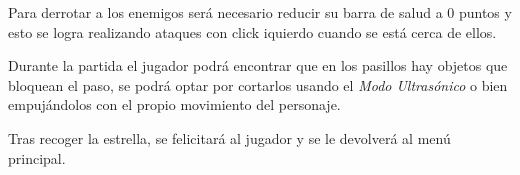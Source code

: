 Para derrotar a los enemigos será necesario reducir su barra de salud a 0 puntos y esto se logra realizando ataques con click iquierdo cuando se está cerca de ellos.

Durante la partida el jugador podrá encontrar que en los pasillos hay objetos que bloquean el paso, se podrá optar por cortarlos usando el \textit{Modo Ultrasónico} o bien empujándolos con el propio movimiento del personaje.

Tras recoger la estrella, se felicitará al jugador y se le devolverá al menú principal.

